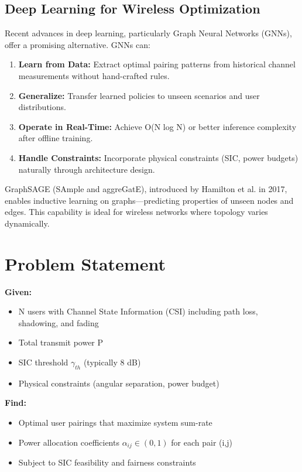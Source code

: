\subsection{Deep Learning for Wireless Optimization}

Recent advances in deep learning, particularly Graph Neural Networks (GNNs), offer a promising alternative. GNNs can:
\begin{enumerate}
    \item \textbf{Learn from Data:} Extract optimal pairing patterns from historical channel measurements without hand-crafted rules.
    \item \textbf{Generalize:} Transfer learned policies to unseen scenarios and user distributions.
    \item \textbf{Operate in Real-Time:} Achieve O(N log N) or better inference complexity after offline training.
    \item \textbf{Handle Constraints:} Incorporate physical constraints (SIC, power budgets) naturally through architecture design.
\end{enumerate}

GraphSAGE (SAmple and aggreGatE), introduced by Hamilton et al. in 2017, enables inductive learning on graphs—predicting properties of unseen nodes and edges. This capability is ideal for wireless networks where topology varies dynamically.

\section{Problem Statement}

\textbf{Given:}
\begin{itemize}
    \item N users with Channel State Information (CSI) including path loss, shadowing, and fading
    \item Total transmit power P
    \item SIC threshold $\gamma_{th}$ (typically 8 dB)
    \item Physical constraints (angular separation, power budget)
\end{itemize}

\textbf{Find:}
\begin{itemize}
    \item Optimal user pairings that maximize system sum-rate
    \item Power allocation coefficients $\alpha_{ij} \in (0,1)$ for each pair (i,j)
    \item Subject to SIC feasibility and fairness constraints
\end{itemize}

